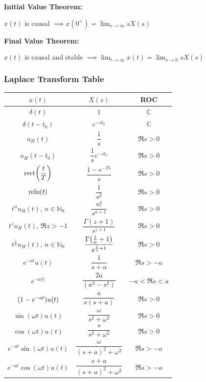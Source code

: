 \documentclass[11pt]{article}
\begin{document}
  \textbf{Initial Value Theorem:}

  \(x(t)\) is causal \(\implies x(0^+) = \displaystyle \lim_{s \to \infty} sX(s)\)

  \textbf{Final Value Theorem:}

  \(x(t)\) is causal and stable \(\implies \displaystyle \lim_{t \to \infty} x(t) =\lim_{s \to 0} sX(s)\)

  \pagebreak

  \subsubsection{Laplace Transform Table}

  \bgroup
  \renewcommand{\arraystretch}{2}
  \setlength{\tabcolsep}{1.2cm}
  \large\begin{tabular}{c|c|c}
    \(x(t)\) & \(X(s)\) & ROC \\
    \hline
    \(\delta(t)\) & \(1\) & \(\mathbb{C}\) \\
    \(\delta(t - t_0)\) & \(e^{-st_0}\) & \(\mathbb{C}\) \\
    \(u_H(t)\) & \(\dfrac{1}{s}\) & \(\Re{s} > 0\) \\
    \(u_H(t - t_0)\) & \(\dfrac{1}{s}e^{-st_0}\) & \(\Re{s} > 0\) \\
    \(\mathrm{rect}{\left( \dfrac{t}{T} \right)}\) & \(\dfrac{1 - e^{-Ts}}{s}\) & \(\Re{s} > 0\) \\
    \(\mathrm{relu}(t)\) & \(\dfrac{1}{s^2}\) & \(\Re{s} > 0\) \\
    \(t^n u_H(t)\), \(n \in \mathbb{N}_0\) & \(\dfrac{n!}{s^{n + 1}}\) & \(\Re{s} > 0\) \\
    \(t^z u_H(t)\), \(\Re{z} > -1\) & \(\dfrac{\Gamma(z + 1)}{s^{z + 1}}\) & \(\Re{s} > 0\) \\
    \(t^{\frac{1}{n}} u_H(t)\),
    \(n \in \mathbb{N}_0\) & \(\dfrac{\Gamma{\left( \frac{1}{n} + 1 \right)}}{s^{\frac{1}{n} + 1}}\) &
    \(\Re{s} > 0\) \\
    \(e^{-at}u(t)\) & \(\dfrac{1}{s + a}\) & \(\Re{s} > -a\) \\
    \(e^{-a|t|}\) & \(\dfrac{2a}{(a^2 - s^2)}\) & \( -a < \Re{s} < a\) \\
    \({\left( 1 - e^{-at} \right)}u(t)\) & \(\dfrac{a}{s(s + a)}\) & \( \Re{s} > 0\) \\
    \(\sin(\omega t)u(t)\) & \(\dfrac{\omega}{s^2 + \omega^2}\) & \( \Re{s} > 0\) \\
    \(\cos(\omega t)u(t)\) & \(\dfrac{s}{s^2 + \omega^2}\) & \( \Re{s} > 0\) \\
    \(e^{-at}\sin(\omega t)u(t)\) & \(\dfrac{\omega}{(s + a)^2 + \omega^2}\) & \(\Re{s} > -a\) \\
    \(e^{-at}\cos(\omega t)u(t)\) & \(\dfrac{s + a}{(s + a)^2 + \omega^2}\) & \(\Re{s} > -a\) \\
  \end{tabular}
  \egroup
\end{document}

